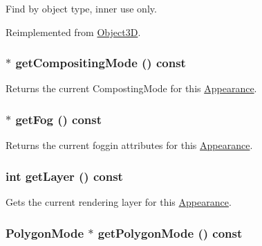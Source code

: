 Find by object type, inner use only. 

Reimplemented from \hyperlink{classm3g_1_1Object3D_4dadb21b568b0230fac106f15040138c}{Object3D}.\hypertarget{classm3g_1_1Appearance_e4045934febb56891c15e14486b239a8}{
\subsubsection[{getCompositingMode}]{ $\ast$ getCompositingMode () const}}
\label{classm3g_1_1Appearance_e4045934febb56891c15e14486b239a8}


Returns the current CompostingMode for this \hyperlink{classm3g_1_1Appearance}{Appearance}. \hypertarget{classm3g_1_1Appearance_93143a921b998ff69576147a59eb44d4}{
\subsubsection[{getFog}]{ $\ast$ getFog () const}}
\label{classm3g_1_1Appearance_93143a921b998ff69576147a59eb44d4}


Returns the current foggin attributes for this \hyperlink{classm3g_1_1Appearance}{Appearance}. \hypertarget{classm3g_1_1Appearance_df831e0e0ebf9d7e997150e497e6a6cf}{
\subsubsection[{getLayer}]{\setlength{\rightskip}{0pt plus 5cm}int getLayer () const}}
\label{classm3g_1_1Appearance_df831e0e0ebf9d7e997150e497e6a6cf}


Gets the current rendering layer for this \hyperlink{classm3g_1_1Appearance}{Appearance}. \hypertarget{classm3g_1_1Appearance_dd3ddcefcd18339150d281b155602886}{
\subsubsection[{getPolygonMode}]{\setlength{\rightskip}{0pt plus 5cm}PolygonMode $\ast$ getPolygonMode () const}}
\label{classm3g_1_1Appearance_dd3ddcefcd18339150d281b155602886}


